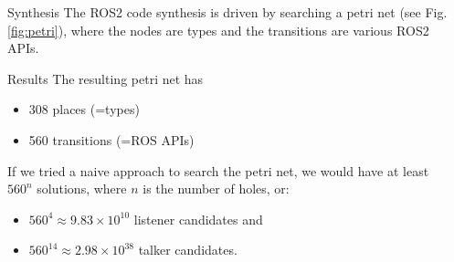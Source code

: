 \documentclass[final]{beamer}
\newlength{\sepwid}
\newlength{\onecolwid}
\begin{document}
\begin{frame}[t]
\begin{columns}[t]
\begin{column}{\sepwid}\end{column} %

\begin{column}{\onecolwid} %

\begin{block}{Synthesis}
The ROS2 code synthesis is driven by searching a petri net (see Fig. \ref{fig:petri}), where the nodes are types and the transitions are various ROS2 APIs.

\end{block}




\begin{block}{Results}
The resulting petri net has 
\begin{itemize}
\item 308 places (=types)
\item 560 transitions (=ROS APIs)
\end{itemize}

If we tried a naive approach to search the petri net, we would have at least $560^n$ solutions, where $n$ is the number of holes, or:
\begin{itemize}
\item $560^{4} \approx 9.83 \times 10^{10}$ listener candidates and
\item $560^{14} \approx 2.98 \times 10^{38}$ talker candidates.
\end{itemize}


\end{block}
\end{column}
\end{columns}
\end{frame}
\end{document}
